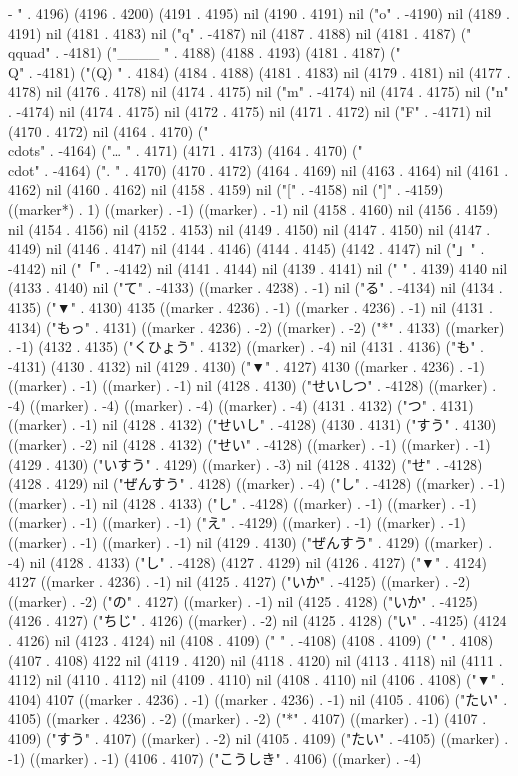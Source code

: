 -
" . 4196) (4196 . 4200) (4191 . 4195) nil (4190 . 4191) nil ("o" . -4190) nil (4189 . 4191) nil (4181 . 4183) nil ("q" . -4187) nil (4187 . 4188) nil (4181 . 4187) ("\\qquad" . -4181) ("____
" . 4188) (4188 . 4193) (4181 . 4187) ("\\Q" . -4181) ("(Q)
" . 4184) (4184 . 4188) (4181 . 4183) nil (4179 . 4181) nil (4177 . 4178) nil (4176 . 4178) nil (4174 . 4175) nil ("m" . -4174) nil (4174 . 4175) nil ("n" . -4174) nil (4174 . 4175) nil (4172 . 4175) nil (4171 . 4172) nil ("F" . -4171) nil (4170 . 4172) nil (4164 . 4170) ("\\cdots" . -4164) ("…
" . 4171) (4171 . 4173) (4164 . 4170) ("\\cdot" . -4164) (".
" . 4170) (4170 . 4172) (4164 . 4169) nil (4163 . 4164) nil (4161 . 4162) nil (4160 . 4162) nil (4158 . 4159) nil ("[" . -4158) nil ("]" . -4159) ((marker*) . 1) ((marker) . -1) ((marker) . -1) nil (4158 . 4160) nil (4156 . 4159) nil (4154 . 4156) nil (4152 . 4153) nil (4149 . 4150) nil (4147 . 4150) nil (4147 . 4149) nil (4146 . 4147) nil (4144 . 4146) (4144 . 4145) (4142 . 4147) nil ("」" . -4142) nil ("「" . -4142) nil (4141 . 4144) nil (4139 . 4141) nil (" " . 4139) 4140 nil (4133 . 4140) nil ("て" . -4133) ((marker . 4238) . -1) nil ("る" . -4134) nil (4134 . 4135) ("▼" . 4130) 4135 ((marker . 4236) . -1) ((marker . 4236) . -1) nil (4131 . 4134) ("もっ" . 4131) ((marker . 4236) . -2) ((marker) . -2) ("*" . 4133) ((marker) . -1) (4132 . 4135) ("くひょう" . 4132) ((marker) . -4) nil (4131 . 4136) ("も" . -4131) (4130 . 4132) nil (4129 . 4130) ("▼" . 4127) 4130 ((marker . 4236) . -1) ((marker) . -1) ((marker) . -1) nil (4128 . 4130) ("せいしつ" . -4128) ((marker) . -4) ((marker) . -4) ((marker) . -4) ((marker) . -4) (4131 . 4132) ("つ" . 4131) ((marker) . -1) nil (4128 . 4132) ("せいし" . -4128) (4130 . 4131) ("すう" . 4130) ((marker) . -2) nil (4128 . 4132) ("せい" . -4128) ((marker) . -1) ((marker) . -1) (4129 . 4130) ("いすう" . 4129) ((marker) . -3) nil (4128 . 4132) ("せ" . -4128) (4128 . 4129) nil ("ぜんすう" . 4128) ((marker) . -4) ("し" . -4128) ((marker) . -1) ((marker) . -1) nil (4128 . 4133) ("し" . -4128) ((marker) . -1) ((marker) . -1) ((marker) . -1) ((marker) . -1) ("え" . -4129) ((marker) . -1) ((marker) . -1) ((marker) . -1) ((marker) . -1) nil (4129 . 4130) ("ぜんすう" . 4129) ((marker) . -4) nil (4128 . 4133) ("し" . -4128) (4127 . 4129) nil (4126 . 4127) ("▼" . 4124) 4127 ((marker . 4236) . -1) nil (4125 . 4127) ("いか" . -4125) ((marker) . -2) ((marker) . -2) ("の" . 4127) ((marker) . -1) nil (4125 . 4128) ("いか" . -4125) (4126 . 4127) ("ちじ" . 4126) ((marker) . -2) nil (4125 . 4128) ("い" . -4125) (4124 . 4126) nil (4123 . 4124) nil (4108 . 4109) (" " . -4108) (4108 . 4109) (" " . 4108) (4107 . 4108) 4122 nil (4119 . 4120) nil (4118 . 4120) nil (4113 . 4118) nil (4111 . 4112) nil (4110 . 4112) nil (4109 . 4110) nil (4108 . 4110) nil (4106 . 4108) ("▼" . 4104) 4107 ((marker . 4236) . -1) ((marker . 4236) . -1) nil (4105 . 4106) ("たい" . 4105) ((marker . 4236) . -2) ((marker) . -2) ("*" . 4107) ((marker) . -1) (4107 . 4109) ("すう" . 4107) ((marker) . -2) nil (4105 . 4109) ("たい" . -4105) ((marker) . -1) ((marker) . -1) (4106 . 4107) ("こうしき" . 4106) ((marker) . -4) 